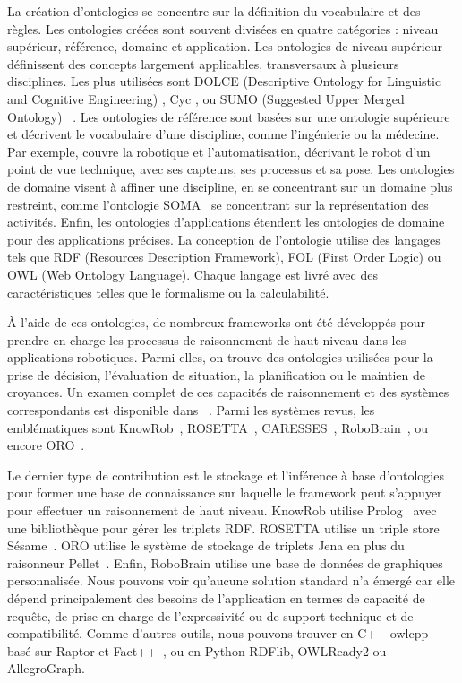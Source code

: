 La création d'ontologies se concentre sur la définition du vocabulaire et des règles. Les ontologies créées sont souvent divisées en quatre catégories : niveau supérieur, référence, domaine et application. Les ontologies de niveau supérieur définissent des concepts largement applicables, transversaux à plusieurs disciplines. Les plus utilisées sont DOLCE (Descriptive Ontology for Linguistic and Cognitive Engineering) \cite{masolo_2003_dolce}, Cyc \cite{lenat_1989_building}, ou SUMO (Suggested Upper Merged Ontology) ~\cite{niles_2001_towards}. Les ontologies de référence sont basées sur une ontologie supérieure et décrivent le vocabulaire d'une discipline, comme l'ingénierie ou la médecine. Par exemple, \cite{schlenoff_2015_ieee} couvre la robotique et l'automatisation, décrivant le robot d'un point de vue technique, avec ses capteurs, ses processus et sa pose. Les ontologies de domaine visent à affiner une discipline, en se concentrant sur un domaine plus restreint, comme l'ontologie SOMA~\cite{bessler_2020_foundations} se concentrant sur la représentation des activités. Enfin, les ontologies d'applications étendent les ontologies de domaine pour des applications précises. La conception de l'ontologie utilise des langages tels que RDF (Resources Description Framework), FOL (First Order Logic) ou OWL (Web Ontology Language). Chaque langage est livré avec des caractéristiques telles que le formalisme ou la calculabilité.

À l'aide de ces ontologies, de nombreux frameworks ont été développés pour prendre en charge les processus de raisonnement de haut niveau dans les applications robotiques. Parmi elles, on trouve des ontologies utilisées pour la prise de décision, l'évaluation de situation, la planification ou le maintien de croyances. Un examen complet de ces capacités de raisonnement et des systèmes correspondants est disponible dans ~\cite{olivares_2019_review}. Parmi les systèmes revus, les emblématiques sont KnowRob~\cite{tenorth_2013_knowrob}, ROSETTA~\cite{stenmark_2013_knowledge}, CARESSES~\cite{bruno_2017_caresses}, RoboBrain~\cite{saxena_2014_robobrain}, ou encore ORO~\cite{lemaignan_2010_oro}.

Le dernier type de contribution est le stockage et l'inférence à base d'ontologies pour former une base de connaissance sur laquelle le framework peut s'appuyer pour effectuer un raisonnement de haut niveau. KnowRob utilise Prolog~\cite{wielemaker_2003_prolog} avec une bibliothèque pour gérer les triplets RDF. ROSETTA utilise un triple store Sésame~\cite{broekstra_2002_sesame}. ORO utilise le système de stockage de triplets Jena en plus du raisonneur Pellet~\cite{sirin_2007_pellet}. Enfin, RoboBrain utilise une base de données de graphiques personnalisée. Nous pouvons voir qu'aucune solution standard n'a émergé car elle dépend principalement des besoins de l'application en termes de capacité de requête, de prise en charge de l'expressivité ou de support technique et de compatibilité. Comme d'autres outils, nous pouvons trouver en C++ owlcpp~\cite{levin_2011_owl} basé sur Raptor et Fact++~\cite{tsarkov_2006_fact}, ou en Python RDFlib, OWLReady2 ou AllegroGraph. 

